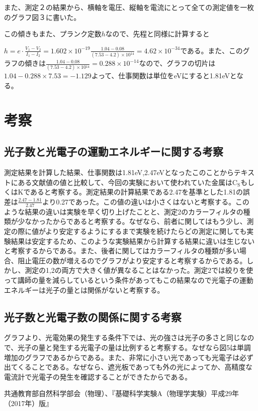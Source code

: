 \documentclass{jsarticle}
\begin{document}
また、測定２の結果から、横軸を電圧、縦軸を電流にとって全ての測定値を一枚のグラフ図３に書いた。

この傾きもまた、プランク定数$h$なので、先程と同様に計算すると
\par $h = e\cdot\frac{V_1-V_2}{I_1-I_2} = 1.602\times 10^{-19} \frac{1.04-0.08}{(7.53-4.2)\times 10{^14}} = 4.62\times 10^{-34}$である。また、このグラフの傾きは$\frac{1.04-0.08}{(7.53-4.2)\times 10{^14}} = 0.288\times 10^{-14}$なので、グラフの切片は$1.04 - 0.288\times 7.53 = -1.129$よって、仕事関数は単位をeVにすると1.81eVとなる。


\section{考察}

\subsection{光子数と光電子の運動エネルギーに関する考察}

測定結果を計算した結果、仕事関数は1.81eV,2.47eVとなったこのことからテキストにある文献値の値と比較して、今回の実験において使われていた金属は$\textrm{C}_\textrm{S}$もしくはKであると考察する。測定結果の計算結果である2.47を基準とした1.81の誤差は$\frac{2.47-1.81}{2.47}$より0.27であった。この値の違いは小さくはないと考察する。このような結果の違いは実験を早く切り上げたことと、測定2のカラーフィルタの種類が少なかったからであると考察する。なぜなら、前者に関してはもう少し、測定の際に値がより安定するようにするまで実験を続けたらどの測定に関しても実験結果は安定するため、このような実験結果から計算する結果に違いは生じないと考察するからである。また、後者に関してはカラーフィルタの種類が多い場合、阻止電圧の数が増えるのでグラフがより安定すると考察するからである。しかし、測定の1,2の両方で大きく値が異なることはなかった。測定2では絞りを使って講師の量を減らしているという条件があってもこの結果なので光電子の運動エネルギーは光子の量とは関係がないと考察する。

\subsection{光子数と光電子数の関係に関する考察}

グラフより、光電効果の発生する条件下では、光の強さは光子の多さと同じなので、光子の量と発生する光電子の量は比例すると考察する。なぜなら図5は単調増加のグラフであるからである。また、非常に小さい光であっても光電子は必ず出てくることである。なぜなら、遮光板であっても外の光によってか、高精度な電流計で光電子の発生を確認することができたからである。



\begin{thebibliography}{99}
     共通教育部自然科学部会（物理）、『基礎科学実験A（物理学実験）平成29年（2017年）版』
\end{thebibliography}
\end{document}
